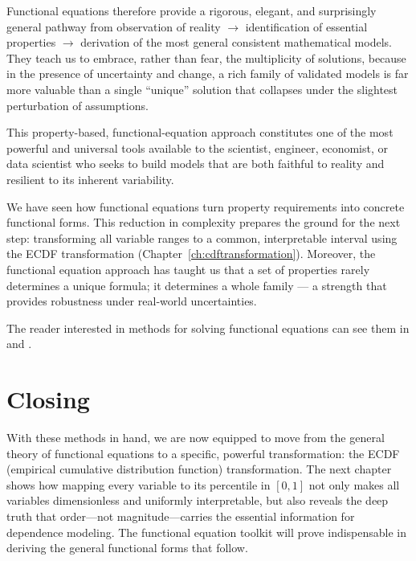 Functional equations therefore provide a rigorous, elegant, and surprisingly general pathway from observation of reality $\to$ identification of essential properties $\to$ derivation of the most general consistent mathematical models. They teach us to embrace, rather than fear, the multiplicity of solutions, because in the presence of uncertainty and change, a rich family of validated models is far more valuable than a single ``unique'' solution that collapses under the slightest perturbation of assumptions.

This property-based, functional-equation approach constitutes one of the most powerful and universal tools available to the scientist, engineer, economist, or data scientist who seeks to build models that are both faithful to reality and resilient to its inherent variability.

We have seen how functional equations turn property requirements into concrete functional forms. This reduction in complexity prepares the ground for the next step: transforming all variable ranges to a common, interpretable interval using the ECDF transformation (Chapter~\ref{ch:cdftransformation}). Moreover, the functional equation approach has taught us that a set of properties rarely determines a unique formula; it determines a whole family — a strength that provides robustness under real‑world uncertainties.

The reader interested in methods for solving functional equations can see them in \cite{aczel2006lectures} and \cite{castillo2004functional}.

\section*{Closing}

With these methods in hand, we are now equipped to move from the general theory of functional equations to a specific, powerful transformation: the ECDF (empirical cumulative distribution function) transformation. The next chapter shows how mapping every variable to its percentile in \([0,1]\) not only makes all variables dimensionless and uniformly interpretable, but also reveals the deep truth that order—not magnitude—carries the essential information for dependence modeling. The functional equation toolkit will prove indispensable in deriving the general functional forms that follow.


